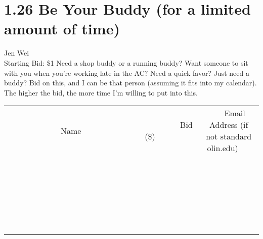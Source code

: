 \documentclass[11pt]{article}
\begin{document}
\section*{1.26 Be Your Buddy (for a limited amount of time)}
Jen Wei
\\
Starting Bid: \$1
\newline
Need a shop buddy or a running buddy? Want someone to sit with you when you're working late in the AC? Need a quick favor? Just need a buddy? Bid on this, and I can be that person (assuming it fits into my calendar). The higher the bid, the more time I'm willing to put into this.
\\[6ex]
\begin{tabular}{c c c}
~~~~~~~~~~~~~Name~~~~~~~~~~~~~ & ~~~~~~~~~Bid (\$)~~~~~~~~~  & ~~~Email Address (if not standard olin.edu)~~~\\
 & & \\
\hline
 & & \\
\hline
 & & \\
\hline
 & & \\
\hline
 & & \\
\hline
 & & \\
\hline
 & & \\
\hline
 & & \\
\hline
 & & \\
\hline
 & & \\
\hline
 & & \\
\hline
 & & \\
\hline
 & & \\
\hline
 & & \\
\hline
 & & \\
\hline
 & & \\
\hline
 & & \\
\hline
 & & \\
\hline
 & & \\
\hline
 & & \\
\hline
 & & \\
\hline
 & & \\
\hline
 & & \\
\hline
 & & \\
\hline
 & & \\
\hline
 & & \\
\hline
\end{tabular}
\newpage
\end{document}
